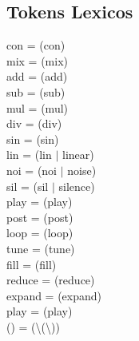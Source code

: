 \documentclass[a4paper,titlepage,10pt]{article}
\begin{document}
\subsection{Tokens Lexicos}
\begin{multicols}{2}
con = (con)\\
mix = (mix)\\
add = (add)\\
sub = (sub)\\
mul = (mul)\\
div = (div)\\
sin = (sin)\\
lin = (lin $|$ linear)\\
noi = (noi $|$ noise)\\
sil = (sil $|$ silence)\\
play = (play)\\
post = (post)\\
loop = (loop)\\
tune = (tune)\\
fill = (fill)\\
reduce = (reduce)\\
expand = (expand)\\
play = (play)\\
() = (\textbackslash(\textbackslash))
\end{multicols}
\end{document}
